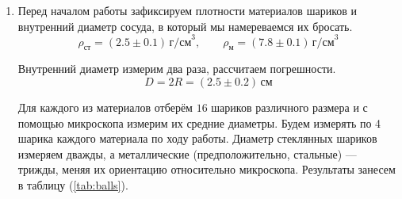 \documentclass[a4paper,12pt]{article} %
\begin{document}
\begin{enumerate}
  \item Перед началом работы зафиксируем плотности материалов шариков и внутренний диаметр сосуда, в который мы намереваемся их бросать.
	\begin{equation}
		\rho_\text{ст} = (2.5 \pm 0.1) \, \text{г/см}^3, \qquad \rho_\text{м} = (7.8 \pm 0.1) \, \text{г/см}^3
	\end{equation}

	Внутренний диаметр измерим два раза, рассчитаем погрешности.
	\begin{equation}
		D = 2R = (2.5 \pm 0.2) \, \text{см}
	\end{equation}
	
	Для каждого из материалов отберём $16$ шариков различного размера и с помощью микроскопа измерим их средние диаметры. Будем измерять по 4 шарика каждого материала по ходу работы. Диаметр стеклянных шариков измеряем дважды, а металлические (предположительно, стальные) — трижды, меняя их ориентацию относительно микроскопа. Результаты занесем в таблицу (\ref{tab:balls}).
  

\end{enumerate}
\end{document}
